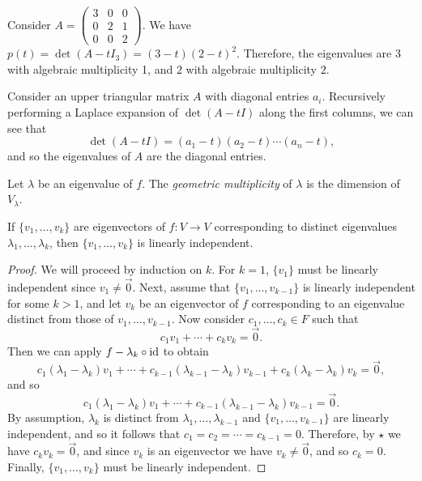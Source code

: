 \begin{exmp}
    Consider $A = \begin{pmatrix}3 & 0 & 0 \\ 0 & 2 & 1 \\ 0 & 0 & 2\end{pmatrix}$. We have $p(t) = \det(A - tI_3) = (3-t)(2-t)^2$. Therefore, the eigenvalues are $3$ with algebraic multiplicity 1, and $2$ with algebraic multiplicity $2$.
\end{exmp}

\begin{rmk}
    Consider an upper triangular matrix $A$ with diagonal entries $a_i$. Recursively performing a Laplace expansion of $\det(A-tI)$ along the first columns, we can see that \[\det(A-tI) = (a_1 - t)(a_2 - t)\cdots(a_n-t),\] and so the eigenvalues of $A$ are the diagonal entries.
\end{rmk}

\begin{defn}
    Let $\lambda$ be an eigenvalue of $f$. The \emph{geometric multiplicity} of $\lambda$ is the dimension of $V_{\lambda}$.
\end{defn}

\begin{thm}\label{distinct-eigenvalues-linear-independence}
    If $\{v_1, \ldots, v_k\}$ are eigenvectors of $f: V \to V$ corresponding to distinct eigenvalues $\lambda_1, \ldots, \lambda_k$, then $\{v_1, \ldots, v_k\}$ is linearly independent.
\end{thm}

\begin{proof}
    We will proceed by induction on $k$. For $k = 1$, $\{v_1\}$ must be linearly independent since $v_1 \neq \vec{0}$. Next, assume that $\{v_1, \ldots, v_{k-1}\}$ is linearly independent for some $k > 1$, and let $v_k$ be an eigenvector of $f$ corresponding to an eigenvalue distinct from those of $v_1, \ldots, v_{k-1}$. Now consider $c_1, \ldots, c_k \in F$ such that
    \begin{equation*}\tag{$\star$}c_1v_1 + \cdots + c_kv_k = \vec{0}.\end{equation*}
    Then we can apply $f - \lambda_k\circ\operatorname{id}$ to obtain
    \[c_1(\lambda_1 - \lambda_k)v_1 + \cdots + c_{k-1}(\lambda_{k-1} - \lambda_k)v_{k-1} + c_k(\lambda_k - \lambda_k)v_k = \vec{0},\] and so
    \[c_1(\lambda_1 - \lambda_k)v_1 + \cdots + c_{k-1}(\lambda_{k-1} - \lambda_k)v_{k-1} = \vec{0}.\] By assumption, $\lambda_k$ is distinct from $\lambda_1, \ldots, \lambda_{k-1}$ and $\{v_1, \ldots, v_{k-1}\}$ are linearly independent, and so it follows that $c_1 = c_2 = \cdots = c_{k-1} = 0$. Therefore, by $\star$ we have $c_kv_k = \vec{0}$, and since $v_k$ is an eigenvector we have $v_k \neq \vec{0}$, and so $c_k = 0$. Finally, $\{v_1, \ldots, v_k\}$ must be linearly independent.
\end{proof}

